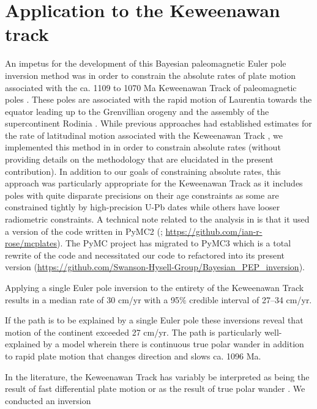 \documentclass[11pt,letterpaper]{article}
\begin{document}
\section*{Application to the Keweenawan track}
\label{sec:keweenawan}

An impetus for the development of this Bayesian paleomagnetic Euler pole inversion method was in order to constrain the absolute rates of plate motion associated with the ca. 1109 to 1070 Ma Keweenawan Track of paleomagnetic poles \citep{Swanson-Hysell2019a}. These poles are associated with the rapid motion of Laurentia towards the equator leading up to the Grenvillian orogeny and the assembly of the supercontinent Rodinia \citep{Swanson-Hysell2021a}. While previous approaches had established estimates for the rate of latitudinal motion associated with the Keweenawan Track \citep{Davis1997a, Swanson-Hysell2014b}, we implemented this method in \citet{Swanson-Hysell2019a} in order to constrain absolute rates (without providing details on the methodology that are elucidated in the present contribution). In addition to our goals of constraining absolute rates, this approach was particularly appropriate for the Keweenawan Track as it includes poles with quite disparate precisions on their age constraints as some are constrained tightly by high-precision U-Pb dates \citep[e.g.]{Fairchild2017a} while others have looser radiometric constraints. A technical note related to the analysis in \citet{Swanson-Hysell2019a} is that it used a version of the code written in PyMC2 (\citealp{}; \url{https://github.com/ian-r-rose/mcplates}). The PyMC project has migrated to PyMC3 which is a total rewrite of the code \citep{Salvatier2016a} and necessitated our code to refactored into its present version (\url{https://github.com/Swanson-Hysell-Group/Bayesian_PEP_inversion}). 

Applying a single Euler pole inversion to the entirety of the Keweenawan Track results in a median rate of 30 cm/yr with a 95$\%$ credible interval of 27–34 cm/yr. 

If the path is to be explained by a single Euler pole these inversions reveal that motion of the continent exceeded 27 cm/yr. The path is particularly well-explained by a model wherein there is continuous true polar wander in addition to rapid plate motion that changes direction and slows ca. 1096 Ma.

In the literature, the Keweenawan Track has variably be interpreted as being the result of fast differential plate motion \citep[e.g.]{Davis1997a,Swanson-Hysell2009a} or as the result of true polar wander \citep[e.g.]{Evans2003a}. We conducted an inversion 
\end{document}
